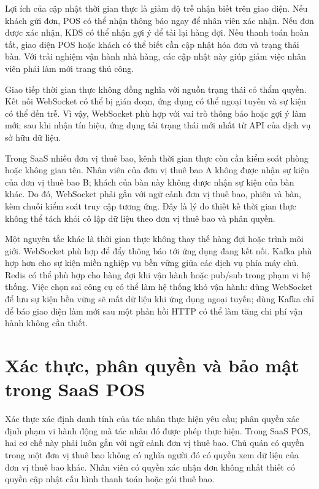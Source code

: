 Lợi ích của cập nhật thời gian thực là giảm độ trễ nhận biết trên giao diện. Nếu khách gửi đơn, POS có thể nhận thông báo ngay để nhân viên xác nhận. Nếu đơn được xác nhận, KDS có thể nhận gợi ý để tải lại hàng đợi. Nếu thanh toán hoàn tất, giao diện POS hoặc khách có thể biết cần cập nhật hóa đơn và trạng thái bàn. Với trải nghiệm vận hành nhà hàng, các cập nhật này giúp giảm việc nhân viên phải làm mới trang thủ công.

Giao tiếp thời gian thực không đồng nghĩa với nguồn trạng thái có thẩm quyền. Kết nối WebSocket có thể bị gián đoạn, ứng dụng có thể ngoại tuyến và sự kiện có thể đến trễ. Vì vậy, WebSocket phù hợp với vai trò thông báo hoặc gợi ý làm mới; sau khi nhận tín hiệu, ứng dụng tải trạng thái mới nhất từ API của dịch vụ sở hữu dữ liệu.

Trong SaaS nhiều đơn vị thuê bao, kênh thời gian thực còn cần kiểm soát phòng hoặc không gian tên. Nhân viên của đơn vị thuê bao A không được nhận sự kiện của đơn vị thuê bao B; khách của bàn này không được nhận sự kiện của bàn khác. Do đó, WebSocket phải gắn với ngữ cảnh đơn vị thuê bao, phiên và bàn, kèm chuỗi kiểm soát truy cập tương ứng. Đây là lý do thiết kế thời gian thực không thể tách khỏi cô lập dữ liệu theo đơn vị thuê bao và phân quyền.

Một nguyên tắc khác là thời gian thực không thay thế hàng đợi hoặc trình môi giới. WebSocket phù hợp để đẩy thông báo tới ứng dụng đang kết nối. Kafka phù hợp hơn cho sự kiện miền nghiệp vụ bền vững giữa các dịch vụ phía máy chủ. Redis có thể phù hợp cho hàng đợi khi vận hành hoặc pub/sub trong phạm vi hệ thống. Việc chọn sai công cụ có thể làm hệ thống khó vận hành: dùng WebSocket để lưu sự kiện bền vững sẽ mất dữ liệu khi ứng dụng ngoại tuyến; dùng Kafka chỉ để báo giao diện làm mới sau một phản hồi HTTP có thể làm tăng chi phí vận hành không cần thiết.

\section{Xác thực, phân quyền và bảo mật trong SaaS POS}

Xác thực xác định danh tính của tác nhân thực hiện yêu cầu; phân quyền xác định phạm vi hành động mà tác nhân đó được phép thực hiện. Trong SaaS POS, hai cơ chế này phải luôn gắn với ngữ cảnh đơn vị thuê bao. Chủ quán có quyền trong một đơn vị thuê bao không có nghĩa người đó có quyền xem dữ liệu của đơn vị thuê bao khác. Nhân viên có quyền xác nhận đơn không nhất thiết có quyền cập nhật cấu hình thanh toán hoặc gói thuê bao.

